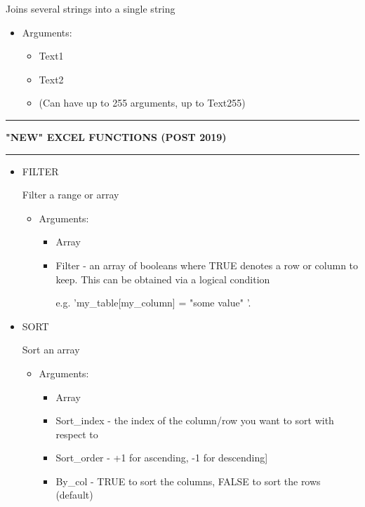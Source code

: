 \documentclass[8pt]{extarticle}
\newcommand{\heading}[1]{%
    \noindent
    \rule{\linewidth}{0.4pt}
    \begin{center}
        \vspace{-1ex}
        \textbf{#1}        
        \vspace{-2.5ex}
    \end{center}
    \rule{\linewidth}{0.4pt}
}
\begin{document}
\begin{multicols}{3}
\begin{itemize}
    Joins several strings into a single string
    \begin{itemize}
        \item Arguments:
        \begin{itemize}
            \item Text1 
            \item Text2
            \item (Can have up to 255 arguments, up to Text255)
        \end{itemize}
    \end{itemize}
\end{itemize}

\heading{"NEW" EXCEL FUNCTIONS (POST 2019)}

\begin{itemize}
    \item FILTER
    
    Filter a range or array
    \begin{itemize}
        \item Arguments:
        \begin{itemize}
            \item Array
            \item Filter - an array of booleans where TRUE denotes a row or column to keep. This can be obtained via a logical condition 
            
            e.g. 'my\_table[my\_column] = "some value" '.
        \end{itemize}
    \end{itemize}
\end{itemize}

\begin{itemize}
    \item SORT
    
    Sort an array 
    \begin{itemize}
        \item Arguments:
        \begin{itemize}
            \item Array
            \item Sort\_index - the index of the column/row you want to sort with respect to 
            \item Sort\_order - +1 for ascending, -1 for descending]
            \item By\_col - TRUE to sort the columns, FALSE to sort the rows (default)
        \end{itemize}
    \end{itemize}
\end{itemize}


\end{multicols}
\end{document}
